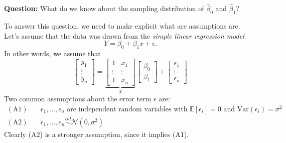 \documentclass[10pt]{article}
\theoremstyle{definition}
\newcommand{\vt}{\vskip 5mm} %
\newcommand{\Fl}{\vt\noindent\textbf} %
\newcommand{\1}[1]{\textbf{1}_{\left[#1\right]}} %
\def\E{\mathbb{E}} %
\def\Var{\mathrm{Var}} %
\begin{document}
\Fl{Question:} What do we know about the sampling distribution of
$\widehat{\beta}_{0}$ and $\widehat{\beta}_{1}$?

To answer this question, we need to make explicit what are assumptions are.
Let's assume that the data was drawn from the \textit{simple linear regression
  model}
\begin{equation*}
  Y=\beta_{0}+\beta_{1}x+\epsilon.
\end{equation*}
In other words, we assume that
\begin{equation*}
  \begin{bmatrix}
    y_{1}\\
    \vdots\\
    y_{n}
  \end{bmatrix}
  =
  \underbrace{\begin{bmatrix}
      1&x_{1}\\
      \vdots&\vdots\\
      1&x_{n}
    \end{bmatrix}}_{X}
  \begin{bmatrix}
    \beta_{0}\\
    \beta_{1}
  \end{bmatrix}
  +
  \begin{bmatrix}
    \epsilon_{1}\\
    \vdots\\
    \epsilon_{n}
  \end{bmatrix}
\end{equation*}
Two common assumptions about the error term $\epsilon$ are:
\begin{align*}
  \mathrm{(A1)} &\quad \epsilon_{1},\ldots, \epsilon_{n} \text{ are
                  independent random variables with } \E\left[\epsilon_{i}
                  \right]=0 \text{ and } \Var(\epsilon_{i})=\sigma^{2}\\
  \mathrm{(A2)} &\quad \epsilon_{1},\ldots,e_{n}\overset{iid}{\sim} \mathcal{N}(0,\sigma^{2})
\end{align*}
Clearly (A2) is a stronger assumption, since it implies (A1).
\end{document}
